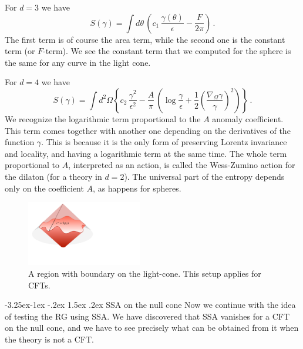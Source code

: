 \documentclass[11pt]{article}
\makeatletter
\renewcommand\subsection{\@startsection{subsection}{2}{\z@}%
                                   {-3.25ex\@plus -1ex \@minus -.2ex}%
                                     {1.5ex \@plus .2ex}%
                                     {\normalfont\bfseries}}
\numberwithin{equation}{section}
\newcommand{\be}{\begin{equation}}
\newcommand{\ee}{\end{equation}}
\makeatother
\begin{document}
For $d=3$ we have 
\be
S(\gamma)=\int d\theta\,\left (c_1\, \frac{\gamma(\theta)}{\epsilon} -\frac{F}{2\pi} \right)\,.\label{tresd}
\ee
The first term is of course the area term, while the second one is the constant term (or $F$-term). We see the constant term that we computed for the sphere is the same for any curve in the light cone. 

For $d=4$ we have
\be
S(\gamma) = \int d^2 \Omega \left \lbrace  c_2\, \frac{\gamma^2}{\epsilon^2}- \frac{A}{\pi} \,  \left(\log \frac{\gamma}{\epsilon} + \frac{1}{2}\left(\frac{\nabla_\Omega \gamma}{\gamma} \right)^2 \right) \right \rbrace\,.\label{cuatrod}
\ee
We recognize the logarithmic term proportional to the $A$ anomaly coefficient. This term comes together with another one depending on the derivatives of the function $\gamma$. This is because it is the only form of preserving Lorentz invariance and locality, and having a logarithmic term at the same time. The whole term proportional to $A$, interpreted as an action, is called the Wess-Zumino action for the dilaton (for a theory in $d=2$). The universal part of the entropy depends only on the coefficient $A$, as happens for spheres.   

\begin{figure}[t]
\begin{center}
\includegraphics[width=0.45\textwidth]{nullcone.pdf} 
\caption{A region with boundary on the light-cone. This setup applies for CFTs.}
\label{rmenos}
\end{center}
\end{figure}

\subsection{SSA on the null cone}
Now we continue with the idea of testing the RG using SSA. We have discovered that SSA vanishes for a CFT on the null cone, and we have to see precisely what can be obtained from it when the theory is not a CFT. 
\end{document}
